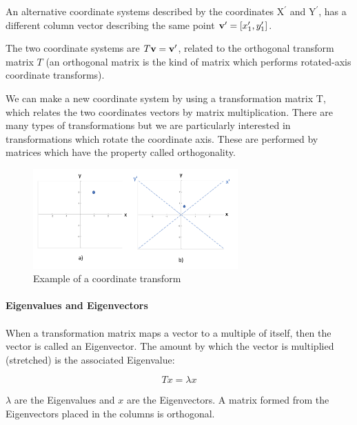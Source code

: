 \documentclass[11pt, oneside]{article}   	%
\begin{document}
An alternative coordinate systems described by the coordinates $\text{X}^\prime$ and $\text{Y}^\prime$, has a different column vector describing the same point ${\bf v^\prime} = [x_1^\prime, y_1^\prime]$.

The two coordinate systems are $T{\bf v} = {\bf v}^\prime$, related to the orthogonal transform matrix $T$ (an orthogonal matrix is the kind of matrix which performs rotated-axis coordinate transforms). 

We can make a new coordinate system by using a transformation matrix T, which relates the two coordinates vectors by matrix multiplication. There are many types of transformations but we are particularly interested in transformations which rotate the coordinate axis. These are performed by matrices which have the property called orthogonality.

\begin{figure}[!h]
	\centering
	\includegraphics[width=0.7\textwidth]{example-coordinate-transform}
	\caption{Example of a coordinate transform}
	\label{fig:CoordinateTransform}
\end{figure}



\paragraph{Eigenvalues and Eigenvectors}
\paragraph{}

When a transformation matrix maps a vector to a multiple of itself, then the vector is called an Eigenvector. The amount by which the vector is multiplied (stretched) is the associated Eigenvalue:

\begin{equation}
T x = \lambda x
\end{equation} 

$\lambda$ are the Eigenvalues and $x$ are the Eigenvectors. A matrix formed from the Eigenvectors placed in the columns is orthogonal.
\end{document}

